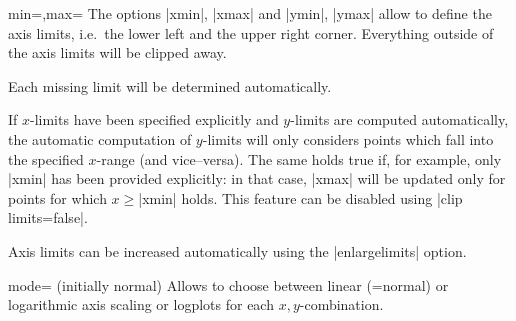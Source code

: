 \begin{pgfplotsxykeylist}{\x min=,\x max=}
The options |xmin|, |xmax| and |ymin|, |ymax| allow to define the axis limits, i.e.\ the lower left and the upper right corner. Everything outside of the axis limits will be clipped away.

Each missing limit will be determined automatically.

If $x$-limits have been specified explicitly and $y$-limits are computed automatically, the automatic computation of $y$-limits will only considers points which fall into the specified $x$-range (and vice--versa). The same holds true if, for example, only |xmin| has been provided explicitly: in that case, |xmax| will be updated only for points for which $x \ge $|xmin| holds. This feature can be disabled using |clip limits=false|. 

Axis limits can be increased automatically using the |enlargelimits| option.
\begin{codeexample}[]
\end{codeexample}

\begin{codeexample}[]
\end{codeexample}

\begin{codeexample}[]
\end{codeexample}
\end{pgfplotsxykeylist}

\begin{pgfplotsxykey}{\x mode= (initially normal)}
Allows to choose between linear (=normal) or logarithmic axis scaling or logplots for each $x,y$-combination.
\end{pgfplotsxykey}

